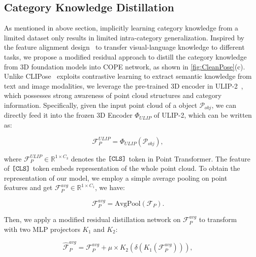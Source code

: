 \subsection{Category Knowledge Distillation}
\label{sec:knowledge_distillation}
As mentioned in above section, implicitly learning category knowledge from a limited dataset only results in limited intra-category generalization.
Inspired by the feature alignment design~\cite{huang2024froster,zhu2024mote,zhu2023fine} to transfer visual-language knowledge to different tasks, we propose a modified residual approach to distill the category knowledge from 3D foundation models into COPE network, as shown in \cref{fig:CleanPose}(c).
Unlike CLIPose~\cite{lin2024clipose} exploits contrastive learning to extract semantic knowledge from text and image modalities, we leverage the pre-trained 3D encoder in ULIP-2~\cite{xue2024ulip}, which possesses strong awareness of point cloud structures and category information.
Specifically, given the input point cloud of a object $\mathcal{P}_{obj}$, we can directly feed it into the frozen 3D Encoder $\Phi_{ULIP}$ of ULIP-2, which can be written as:
\begin{small} 
\begin{equation}
\label{equ:pointbert}
    \mathcal{F}^{ULIP}_{P} = \Phi_{ULIP}(\mathcal{P}_{obj}),
\end{equation}
\end{small}
where $\mathcal{F}^{ULIP}_{P} \in \mathbb{R}^{1 \times C_3}$ denotes the $\verb|[CLS]|$ token in Point Transformer. The feature of $\verb|[CLS]|$ token embeds representation of the whole point cloud. To obtain the representation of our model, we employ a simple average pooling on point features and get $\mathcal{F}_{P}^{avg} \in \mathbb{R}^{1 \times C_1}$, we have:
\begin{small} 
\begin{equation}
\label{equ:avg_pool}
    \mathcal{F}_{P}^{avg} = \mathrm{AvgPool}(\mathcal{F}_{P}).
\end{equation}
\end{small}
Then, we apply a modified residual distillation network on $\mathcal{F}_{P}^{avg}$ to transform with two MLP projectors $K_1$ and $K_2$:
\begin{small} 
\begin{equation}
\label{equ:residual}
    \mathcal{\widehat{F}}_{P}^{avg} = \mathcal{F}_{P}^{avg} + \mu \times K_{2}(\delta(K_{1}(\mathcal{F}_{P}^{avg}))),
\end{equation}
\end{small}
